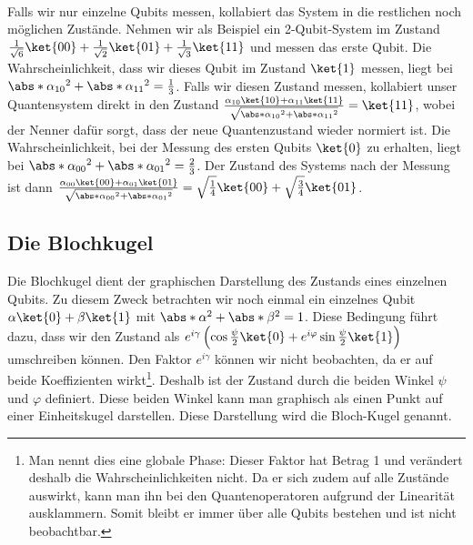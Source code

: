 \paragraph{}

Falls wir nur einzelne Qubits messen, kollabiert das System in die restlichen noch möglichen Zustände. Nehmen wir als Beispiel ein 2-Qubit-System im Zustand $\frac{1}{\sqrt{6}}\ket{00} + \frac{1}{\sqrt{2}}\ket{01} + \frac{1}{\sqrt{3}}\ket{11}$ und messen das erste Qubit. Die Wahrscheinlichkeit, dass wir dieses Qubit im Zustand $\ket{1}$ messen, liegt bei $\abs*{\alpha_{10}}^2 + \abs*{\alpha_{11}}^2 = \frac{1}{3}$. Falls wir diesen Zustand messen, kollabiert unser Quantensystem direkt in den Zustand $\frac{\alpha_{10}\ket{10} + \alpha_{11}\ket{11}}{\sqrt{\abs*{\alpha_{10}}^2 + \abs*{\alpha_{11}}^2}} = \ket{11}$, wobei der Nenner dafür sorgt, dass der neue Quantenzustand wieder normiert ist. Die Wahrscheinlichkeit, bei der Messung des ersten Qubits $\ket{0}$ zu erhalten, liegt bei $\abs*{\alpha_{00}}^2 + \abs*{\alpha_{01}}^2 = \frac{2}{3}$. Der Zustand des Systems nach der Messung ist dann $\frac{\alpha_{00}\ket{00} + \alpha_{01}\ket{01}}{\sqrt{\abs*{\alpha_{00}}^2 + \abs*{\alpha_{01}}^2}} = \sqrt{\frac{1}{4}}\ket{00} + \sqrt{\frac{3}{4}}\ket{01}$.

\subsection{Die Blochkugel}
Die Blochkugel dient der graphischen Darstellung des Zustands eines einzelnen Qubits. Zu diesem Zweck betrachten wir noch einmal ein einzelnes Qubit $\alpha\ket{0} + \beta\ket{1}$ mit $\abs*{\alpha}^2 + \abs*{\beta}^2 = 1$. Diese Bedingung führt dazu, dass wir den Zustand als $e^{i\gamma}\left(\cos\frac{\psi}{2}\ket{0} + e^{i\varphi}\sin\frac{\psi}{2}\ket{1}\right)$ umschreiben können. Den Faktor $e^{i\gamma}$ können wir nicht beobachten, da er auf beide Koeffizienten wirkt\footnote{Man nennt dies eine globale Phase: Dieser Faktor hat Betrag 1 und verändert deshalb die Wahrscheinlichkeiten nicht. Da er sich zudem auf alle Zustände auswirkt, kann man ihn bei den Quantenoperatoren aufgrund der Linearität ausklammern. Somit bleibt er immer über alle Qubits bestehen und ist nicht beobachtbar.}. Deshalb ist der Zustand durch die beiden Winkel $\psi$ und $\varphi$ definiert. Diese beiden Winkel kann man graphisch als einen Punkt auf einer Einheitskugel darstellen. Diese Darstellung wird die Bloch-Kugel genannt.
